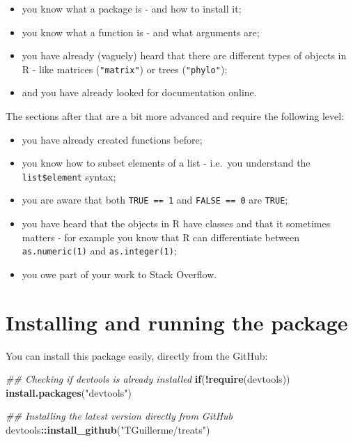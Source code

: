 \documentclass[
]{book}
\newenvironment{Shaded}{\begin{snugshade}}{\end{snugshade}}
\newcommand{\CommentTok}[1]{\textcolor[rgb]{0.56,0.35,0.01}{\textit{#1}}}
\newcommand{\ControlFlowTok}[1]{\textcolor[rgb]{0.13,0.29,0.53}{\textbf{#1}}}
\newcommand{\KeywordTok}[1]{\textcolor[rgb]{0.13,0.29,0.53}{\textbf{#1}}}
\newcommand{\NormalTok}[1]{#1}
\newcommand{\OperatorTok}[1]{\textcolor[rgb]{0.81,0.36,0.00}{\textbf{#1}}}
\newcommand{\StringTok}[1]{\textcolor[rgb]{0.31,0.60,0.02}{#1}}
\providecommand{\tightlist}{%
  \setlength{\itemsep}{0pt}\setlength{\parskip}{0pt}}
\begin{document}
\begin{itemize}
\tightlist
\item
  you know what a package is - and how to install it;
\item
  you know what a function is - and what arguments are;
\item
  you have already (vaguely) heard that there are different types of objects in R - like matrices (\texttt{"matrix"}) or trees (\texttt{"phylo"});
\item
  and you have already looked for documentation online.
\end{itemize}

The sections after that are a bit more advanced and require the following level:

\begin{itemize}
\tightlist
\item
  you have already created functions before;
\item
  you know how to subset elements of a list - i.e.~you understand the \texttt{list\$element} syntax;
\item
  you are aware that both \texttt{TRUE\ ==\ 1} and \texttt{FALSE\ ==\ 0} are \texttt{TRUE};
\item
  you have heard that the objects in R have classes and that it sometimes matters - for example you know that R can differentiate between \texttt{as.numeric(1)} and \texttt{as.integer(1)};
\item
  you owe part of your work to Stack Overflow.
\end{itemize}

\hypertarget{installing-and-running-the-package}{%
\section{Installing and running the package}\label{installing-and-running-the-package}}

You can install this package easily, directly from the GitHub:

\begin{Shaded}
\begin{Highlighting}[]
\CommentTok{\#\# Checking if devtools is already installed}
\ControlFlowTok{if}\NormalTok{(}\OperatorTok{!}\KeywordTok{require}\NormalTok{(devtools)) }\KeywordTok{install.packages}\NormalTok{(}\StringTok{"devtools"}\NormalTok{)}

\CommentTok{\#\# Installing the latest version directly from GitHub}
\NormalTok{devtools}\OperatorTok{::}\KeywordTok{install\_github}\NormalTok{(}\StringTok{"TGuillerme/treats"}\NormalTok{)}
\end{Highlighting}
\end{Shaded}
\end{document}
